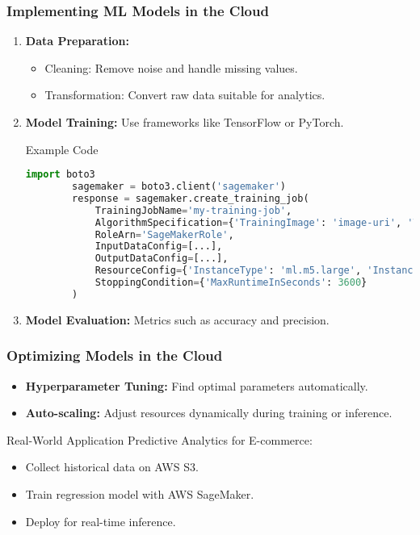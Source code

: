 \documentclass[aspectratio=169]{beamer}
\begin{document}
\begin{frame}[fragile]
    \frametitle{Implementing ML Models in the Cloud}
    \begin{enumerate}
        \item \textbf{Data Preparation:}
        \begin{itemize}
            \item Cleaning: Remove noise and handle missing values.
            \item Transformation: Convert raw data suitable for analytics.
        \end{itemize}
        
        \item \textbf{Model Training:} Use frameworks like TensorFlow or PyTorch.
        \begin{block}{Example Code}
        \begin{lstlisting}[language=Python]
        import boto3
        sagemaker = boto3.client('sagemaker')
        response = sagemaker.create_training_job(
            TrainingJobName='my-training-job',
            AlgorithmSpecification={'TrainingImage': 'image-uri', 'TrainingInputMode': 'File'},
            RoleArn='SageMakerRole',
            InputDataConfig=[...],
            OutputDataConfig=[...],
            ResourceConfig={'InstanceType': 'ml.m5.large', 'InstanceCount': 1, 'VolumeSizeInGB': 10},
            StoppingCondition={'MaxRuntimeInSeconds': 3600}
        )
        \end{lstlisting}
        \end{block}
        
        \item \textbf{Model Evaluation:} Metrics such as accuracy and precision.
    \end{enumerate}
\end{frame}

\begin{frame}[fragile]
    \frametitle{Optimizing Models in the Cloud}
    \begin{itemize}
        \item \textbf{Hyperparameter Tuning:} Find optimal parameters automatically.
        \item \textbf{Auto-scaling:} Adjust resources dynamically during training or inference.
    \end{itemize}
    
    \begin{block}{Real-World Application}
        Predictive Analytics for E-commerce:
        \begin{itemize}
            \item Collect historical data on AWS S3.
            \item Train regression model with AWS SageMaker.
            \item Deploy for real-time inference.
        \end{itemize}
    \end{block}
\end{frame}
\end{document}
